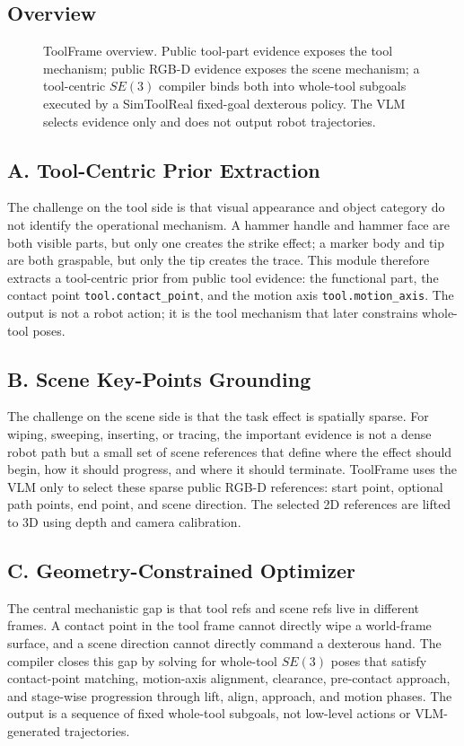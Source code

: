 \documentclass[letterpaper, 10 pt, conference]{ieeeconf}
\newcommand{\method}{ToolFrame}
\begin{document}
\subsection{Overview}
\begin{figure}[t]
\centering
{}
\caption{\method{} overview. Public tool-part evidence exposes the tool
mechanism; public RGB-D evidence exposes the scene mechanism; a tool-centric
$SE(3)$ compiler binds both into whole-tool subgoals executed by a SimToolReal
fixed-goal dexterous policy. The VLM selects evidence only and does not output
robot trajectories.}
\label{fig:overview}
\end{figure}

\subsection{A. Tool-Centric Prior Extraction}
The challenge on the tool side is that visual appearance and object category do
not identify the operational mechanism. A hammer handle and hammer face are
both visible parts, but only one creates the strike effect; a marker body and
tip are both graspable, but only the tip creates the trace. This module
therefore extracts a tool-centric prior from public tool evidence: the
functional part, the contact point \texttt{tool.contact\_point}, and the
motion axis \texttt{tool.motion\_axis}. The output is not a robot action; it
is the tool mechanism that later constrains whole-tool poses.

\subsection{B. Scene Key-Points Grounding}
The challenge on the scene side is that the task effect is spatially sparse.
For wiping, sweeping, inserting, or tracing, the important evidence is not a
dense robot path but a small set of scene references that define where the
effect should begin, how it should progress, and where it should terminate.
\method{} uses the VLM only to select these sparse public RGB-D references:
start point, optional path points, end point, and scene direction. The selected
2D references are lifted to 3D using depth and camera calibration.

\subsection{C. Geometry-Constrained Optimizer}
The central mechanistic gap is that tool refs and scene refs live in different
frames. A contact point in the tool frame cannot directly wipe a world-frame
surface, and a scene direction cannot directly command a dexterous hand. The
compiler closes this gap by solving for whole-tool $SE(3)$ poses that satisfy
contact-point matching, motion-axis alignment, clearance, pre-contact approach,
and stage-wise progression through lift, align, approach, and motion phases.
The output is a sequence of fixed whole-tool subgoals, not low-level actions or
VLM-generated trajectories.
\end{document}
